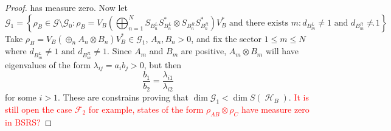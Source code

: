 \documentclass[11pt]{article}
\theoremstyle{newdefinition}
\theoremstyle{newplain}
\theoremstyle{myplain}
\DeclareMathOperator{\HH}{\mathcal{H}}
\DeclareMathOperator{\1}{\mathds{1}}
\begin{document}
\begin{proof}
has measure zero. Now let 
\begin{equation}
    \mathcal{G}_1=\left\{ \rho_B \in \mathcal{G}\setminus \mathcal{G}_0: \rho_B=V_B\left(\bigoplus_{n=1}^N S_{B_n^L}S_{B_n^L}^*\otimes S_{B_n^R}S_{B_n^R}^*\right)V_B^* \text{ and there exists } m: d_{B_m^L}\neq 1 \text{ and } d_{B_m^R}\neq 1\right\}.
\end{equation}
Take $\rho_B=V_B(\oplus_n A_n \otimes B_n)V_B^* \in \mathcal{G}_1$, $A_n,B_n >0$, and  fix  the sector $1 \leq m \leq N$ where $d_{B_m^L}\neq 1 \text{ and } d_{B_m^R}\neq 1$. Since $A_m$ and $B_m$ are positive, $A_m\otimes B_m$ will have eigenvalues of the form $\lambda_{ij}=a_i b_j>0$, but then
\begin{equation}
    \frac{b_1}{b_2}=\frac{\lambda_{i1}}{\lambda_{i2}}
\end{equation}
for some  $i>1$. These are constrains proving that $\dim \mathcal{G}_1 < \dim S(\HH_B)$. 
\textcolor{red}{It is still open the case  $\mathcal{F}_2$  for example, states of the form $\rho_{AB}\otimes \rho_C$ have measure zero in BSRS?}
\end{proof}

\begin{comment}
 \textcolor{red}{
 Now, the manifold $T_{AC}(BSRS)$ has the same dimension that the sphere of positive semidefinte matrices
    \begin{equation}
       \mathbb{S}_B^+=\{ S \in B(\HH_B) : \Vert S \Vert_2=1\}\cap L(\HH_B)_+,
    \end{equation}
    and by previous theorem $T_{AC}(QMC)$ has the same dimension that  $G=\cup_N G_N$ where
    \begin{equation}
        G_N=\left\{ S \in  \mathbb{S}_B^+: S=\bigoplus_{n=1}^N S_{b_n^L}\otimes  S_{b_n^L}, \text{ for some decomposition} \HH_B\simeq \bigoplus_{n=1}^N \HH_{b_n^L}\otimes  \HH_{b_n^L} \right\}
    \end{equation}
    We consider two cases: if $N>1$, the manifold of positive semidefinite block diagonal matrices in the sphere has strict lower dimension (as manifold dimension) than
       $\mathbb{S}_B^+$ so it has zero measure. For $N=1$ if we denote $\hat{d}_L=\frac{1}{2}d_L(d_L+1)$, $\hat{d}_R=\frac{1}{2}d_R(d_R+1)$ (and  assuming $d_L,d_R\geq 2$), the submanifold
    \begin{equation}
        \mathbb{P}_B=\{S \in \mathbb{S}_B : S=S_{B^L}\otimes S_{B^R}\}\cap L(\HH_B)_+,
    \end{equation}
    has dimension (as manifold) at most $\hat{d}_L^2+\hat{d}_R^2$ , which is lower than the dimensions of $\mathbb{S}_B^+$ equal to $(\hat{d}_L\hat{d}_R)^2-1$, and the same conclusion follows.}
\end{comment}
\end{document}
